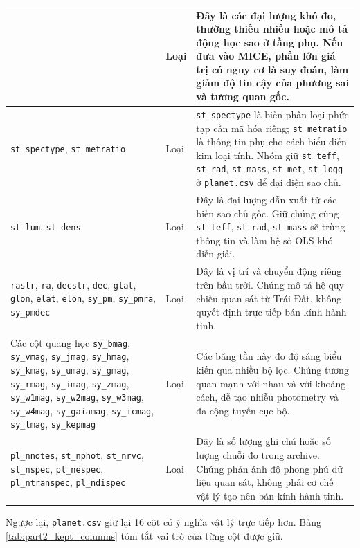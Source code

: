 {\begin{longtable}{@{}p{}p{}p{}@{}}
& Loại
& Đây là các đại lượng khó đo, thường thiếu nhiều hoặc mô tả động học sao ở tầng phụ. Nếu đưa vào
MICE, phần lớn giá trị có nguy cơ là suy đoán, làm giảm độ tin cậy của phương sai và tương quan gốc. \\
\hline
\texttt{st\_spectype}, \texttt{st\_metratio}
& Loại
& \texttt{st\_spectype} là biến phân loại phức tạp cần mã hóa riêng; \texttt{st\_metratio} là thông
tin phụ cho cách biểu diễn kim loại tính. Nhóm giữ \texttt{st\_teff}, \texttt{st\_rad},
\texttt{st\_mass}, \texttt{st\_met}, \texttt{st\_logg} ở \texttt{planet.csv} để đại diện sao chủ. \\
\hline
\texttt{st\_lum}, \texttt{st\_dens}
& Loại
& Đây là đại lượng dẫn xuất từ các biến sao chủ gốc. Giữ chúng cùng \texttt{st\_teff},
\texttt{st\_rad}, \texttt{st\_mass} sẽ trùng thông tin và làm hệ số OLS khó diễn giải. \\
\hline
\texttt{rastr}, \texttt{ra}, \texttt{decstr}, \texttt{dec}, \texttt{glat}, \texttt{glon},
\texttt{elat}, \texttt{elon}, \texttt{sy\_pm}, \texttt{sy\_pmra}, \texttt{sy\_pmdec}
& Loại
& Đây là vị trí và chuyển động riêng trên bầu trời. Chúng mô tả hệ quy chiếu quan sát từ Trái Đất,
không quyết định trực tiếp bán kính hành tinh. \\
\hline
Các cột quang học \texttt{sy\_bmag}, \texttt{sy\_vmag}, \texttt{sy\_jmag},
\texttt{sy\_hmag}, \texttt{sy\_kmag}, \texttt{sy\_umag}, \texttt{sy\_gmag},
\texttt{sy\_rmag}, \texttt{sy\_imag}, \texttt{sy\_zmag}, \texttt{sy\_w1mag},
\texttt{sy\_w2mag}, \texttt{sy\_w3mag}, \texttt{sy\_w4mag}, \texttt{sy\_gaiamag},
\texttt{sy\_icmag}, \texttt{sy\_tmag}, \texttt{sy\_kepmag}
& Loại
& Các băng tần này đo độ sáng biểu kiến qua nhiều bộ lọc. Chúng tương quan mạnh với nhau và với
khoảng cách, dễ tạo nhiễu photometry và đa cộng tuyến cục bộ. \\
\hline
\texttt{pl\_nnotes}, \texttt{st\_nphot}, \texttt{st\_nrvc}, \texttt{st\_nspec},
\texttt{pl\_nespec}, \texttt{pl\_ntranspec}, \texttt{pl\_ndispec}
& Loại
& Đây là số lượng ghi chú hoặc số lượng chuỗi đo trong archive. Chúng phản ánh độ phong phú dữ liệu
quan sát, không phải cơ chế vật lý tạo nên bán kính hành tinh. \\
\hline
\end{longtable}
}

Ngược lại, \texttt{planet.csv} giữ lại 16 cột có ý nghĩa vật lý trực tiếp hơn. Bảng
\ref{tab:part2_kept_columns} tóm tắt vai trò của từng cột được giữ.

